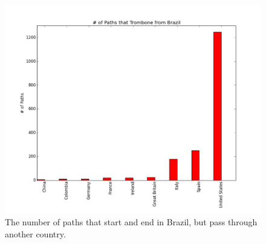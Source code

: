 \begin{figure}
\centering
\includegraphics[width=.5\textwidth]{trombone_graph}
\caption{The number of paths that start and end in Brazil, but pass through another country.}
\label{fig:trombone}
\end{figure}
